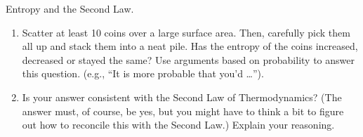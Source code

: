 \begin{aproblem}{Entropy and the Second Law.}
   \begin{enumerate}
   \item Scatter at least 10 coins over a large surface area.  Then,
     carefully pick them all up and stack them into a neat pile.  Has
     the entropy of the coins increased, decreased or stayed the same?
     Use arguments based on probability to answer this question.
     (e.g., ``It is more probable that you'd \dots '').

   \item Is your answer consistent with the Second Law of
     Thermodynamics?  (The answer must, of course, be yes, but you
     might have to think a bit to figure out how to reconcile this
     with the Second Law.)  Explain your reasoning.
   \end{enumerate}
\end{aproblem}


